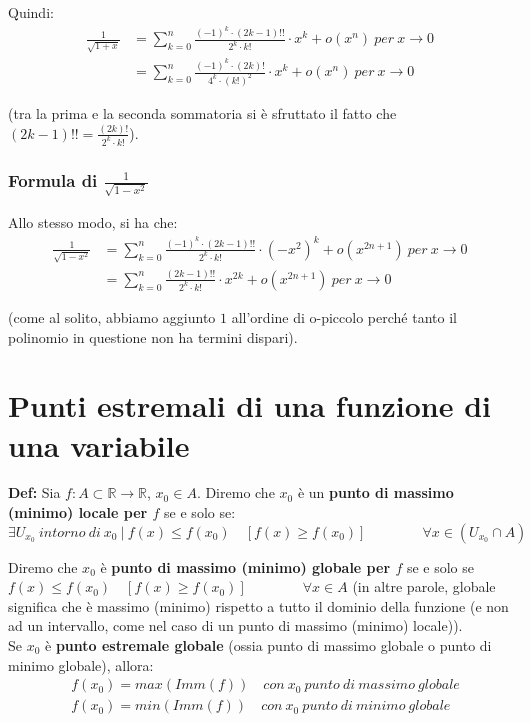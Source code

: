 \documentclass{article}
\begin{document}
\noindent Quindi:
\begin{align*}
    \frac{1}{\sqrt{1 + x}} &= \sum_{k = 0}^n \frac{(-1)^k \cdot (2k - 1)!!}{2^k \cdot k!} \cdot x^k + o (x^n) \ per \ x \to 0 \\
    &= \sum_{k = 0}^n \frac{(-1)^k \cdot (2k)!}{4^k \cdot (k!)^2} \cdot x^k + o(x^n) \ per \ x \to 0
\end{align*}

\noindent (tra la prima e la seconda sommatoria si è sfruttato il fatto che $(2k - 1)!! = \frac{(2k)!}{2^k \cdot k!}$).

\subsubsection{Formula di $\frac{1}{\sqrt{1 - x^2}}$}
Allo stesso modo, si ha che:
\begin{align*}
    \frac{1}{\sqrt{1 - x^2}} &= \sum_{k = 0}^n \frac{(-1)^k \cdot (2k - 1)!!}{2^k \cdot k!} \cdot (-x^2)^k + o(x^{2n + 1}) \ per \ x \to 0 \\
    &= \sum_{k = 0}^n \frac{(2k - 1)!!}{2^k \cdot k!} \cdot x^{2k} + o(x^{2n + 1}) \ per \ x \to 0
\end{align*}

\noindent (come al solito, abbiamo aggiunto $1$ all'ordine di o-piccolo perché tanto il polinomio in questione non ha termini dispari). 

\section{Punti estremali di una funzione di una variabile}
\textbf{Def:} Sia $f: A \subset \mathbb{R} \xrightarrow{} \mathbb{R}$, $x_0 \in A$. Diremo che $x_0$ è un \textbf{punto di massimo (minimo) locale per $f$} se e solo se:
\begin{equation*}
    \exists U_{x_0} \ intorno \ di \ x_0 \ | \ f(x) \leq f(x_0) \quad [f(x) \geq f(x_0)] \qquad \qquad \forall x \in (U_{x_0} \cap A)  
\end{equation*}

\noindent Diremo che $x_0$ è \textbf{punto di massimo (minimo) globale per $f$} se e solo se $f(x) \leq f(x_0) \quad [f(x) \geq f(x_0)] \qquad \qquad \forall x \in A$ (in altre parole, globale significa che è massimo (minimo) rispetto a tutto il dominio della funzione (e non ad un intervallo, come nel caso di un punto di massimo (minimo) locale)). \\

\noindent Se $x_0$ è \textbf{punto estremale globale} (ossia punto di massimo globale o punto di minimo globale), allora:
\begin{align*}
    & f(x_0) = max(Imm(f)) \quad con \ x_0 \ punto \ di \ massimo \ globale \\
    & f(x_0) = min(Imm(f)) \quad con \ x_0 \ punto \ di \ minimo \ globale \\
\end{align*}
\end{document}
